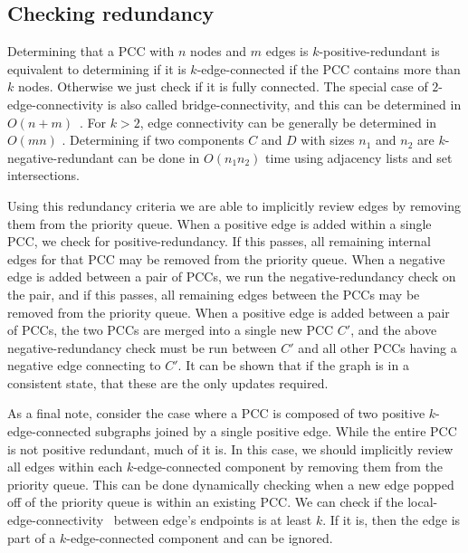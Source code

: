 \subsection{Checking redundancy}

Determining that a PCC with $n$ nodes and $m$ edges is $k$-positive-redundant is equivalent to determining if it
  is $k$-edge-connected if the PCC contains more than $k$ nodes.
Otherwise we just check if it is fully connected.
The special case of $2$-edge-connectivity is also called bridge-connectivity, and this can be determined in %
$O(n + m)$~\cite{eswaran_augmentation_1976,wang_simple_2015}.
For $k>2$, edge connectivity can be generally be determined in $O(mn)$ \cite{esfahanian_connectivity_2017}.
Determining if two components $C$ and $D$ with sizes $n_1$ and $n_2$ are $k$-negative-redundant can be done in
  $O(n_1 n_2)$ time using adjacency lists and set intersections.

Using this redundancy criteria we are able to implicitly review edges by removing them from the priority queue.
When a positive edge is added within a single PCC, we check for positive-redundancy.
If this passes, all remaining internal edges for that PCC may be removed from the priority queue.
When a negative edge is added between a pair of PCCs, we run the negative-redundancy check on the pair, and if
  this passes, all remaining edges between the PCCs may be removed from the priority queue.
When a positive edge is added between a pair of PCCs, the two PCCs are merged into a single new PCC $C'$, and the
  above negative-redundancy check must be run between $C'$ and all other PCCs having a negative edge connecting to
  $C'$.
It can be shown that if the graph is in a consistent state, that these are the only updates required.

As a final note, consider the case where a PCC is composed of two positive $k$-edge-connected subgraphs joined by
  a single positive edge.
While the entire PCC is not positive redundant, much of it is.
In this case, we should implicitly review all edges within each $k$-edge-connected component by removing them
  from the priority queue.
This can be done dynamically checking when a new edge popped off of the priority queue is within an existing PCC.
We can check if the local-edge-connectivity~\cite{esfahanian_connectivity_2017} between edge's endpoints is at
  least $k$.
If it is, then the edge is part of a $k$-edge-connected component and can be ignored.


